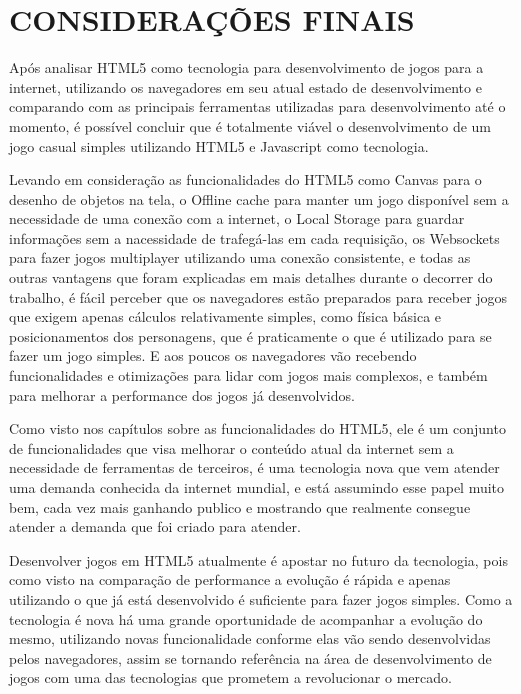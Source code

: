 \section[Considerações finais]{CONSIDERAÇÕES FINAIS}

Após analisar HTML5 como tecnologia para desenvolvimento de jogos para
a internet, utilizando os navegadores em seu atual estado de
desenvolvimento e comparando com as principais ferramentas utilizadas
para desenvolvimento até o momento, é possível concluir que é
totalmente viável o desenvolvimento de um jogo casual simples
utilizando HTML5 e Javascript como tecnologia.

Levando em consideração as funcionalidades do HTML5 como Canvas para o
desenho de objetos na tela, o Offline cache para manter um jogo
disponível sem a necessidade de uma conexão com a internet, o Local
Storage para guardar informações sem a nacessidade de trafegá-las em
cada requisição, os Websockets para fazer jogos multiplayer utilizando
uma conexão consistente, e todas as outras vantagens que foram
explicadas em mais detalhes durante o decorrer do trabalho,
é fácil perceber que os navegadores estão preparados para
receber jogos que exigem apenas cálculos relativamente
simples, como física básica e posicionamentos dos personagens, que é
praticamente o que é utilizado para se fazer um jogo simples. E aos
poucos os navegadores vão recebendo funcionalidades e otimizações para
lidar com jogos mais complexos, e também para melhorar a performance
dos jogos já desenvolvidos.

Como visto nos capítulos sobre as funcionalidades do HTML5, ele é um
conjunto de funcionalidades que visa melhorar o conteúdo
atual da internet sem a necessidade de ferramentas de terceiros, é uma
tecnologia nova que vem atender uma demanda conhecida da
internet mundial, e está assumindo esse papel muito bem, cada vez mais
ganhando publico e mostrando que realmente consegue atender a demanda
que foi criado para atender.

Desenvolver jogos em HTML5 atualmente é
apostar no futuro da tecnologia, pois como visto na comparação de
performance a evolução é rápida e apenas utilizando o que já está
desenvolvido é suficiente para fazer jogos simples. Como a tecnologia
é nova há uma grande oportunidade de acompanhar a evolução do mesmo,
utilizando novas funcionalidade conforme elas vão sendo desenvolvidas
pelos navegadores, assim se tornando referência na área de
desenvolvimento de jogos com uma das tecnologias que prometem a revolucionar o mercado.

